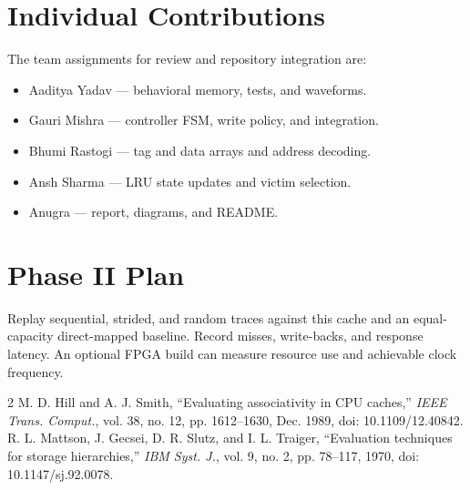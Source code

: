 \documentclass[conference]{IEEEtran}
\begin{document}
\balance
\section{Individual Contributions}
The team assignments for review and repository integration are:
\begin{itemize}
\item Aaditya Yadav --- behavioral memory, tests, and waveforms.
\item Gauri Mishra --- controller FSM, write policy, and integration.
\item Bhumi Rastogi --- tag and data arrays and address decoding.
\item Ansh Sharma --- LRU state updates and victim selection.
\item Anugra --- report, diagrams, and README.
\end{itemize}

\section{Phase II Plan}
Replay sequential, strided, and random traces against this cache and an
equal-capacity direct-mapped baseline. Record misses, write-backs, and
response latency. An optional FPGA build can measure resource use and
achievable clock frequency.

\begin{thebibliography}{2}
M. D. Hill and A. J. Smith, \textquotedblleft Evaluating associativity in CPU
caches,\textquotedblright{} \emph{IEEE Trans. Comput.}, vol. 38, no. 12,
pp. 1612--1630, Dec. 1989, doi: 10.1109/12.40842.
R. L. Mattson, J. Gecsei, D. R. Slutz, and I. L. Traiger,
\textquotedblleft Evaluation techniques for storage hierarchies,\textquotedblright{}
\emph{IBM Syst. J.}, vol. 9, no. 2, pp. 78--117, 1970,
doi: 10.1147/sj.92.0078.
\end{thebibliography}
\end{document}
